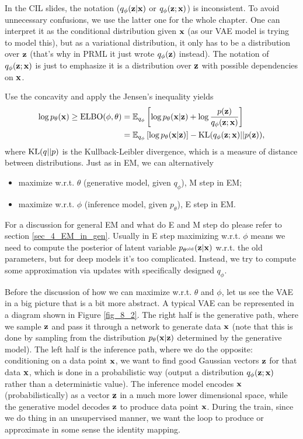 \documentclass[../book-template.tex]{subfiles}
\begin{document}
\begin{remark}
	In the CIL slides, the notation ($q_\phi({\bf z}|{\bf x})$ or $q_\phi({\bf z};{\bf x})$) is inconsistent. To avoid unnecessary confusions, we use the latter one for the whole chapter. One can interpret it as the conditional distribution given ${\bf x}$ (as our VAE model is trying to model this), but as a variational distribution, it only has to be a distribution over ${\bf z}$ (that's why in PRML it just wrote $q_\phi({\bf z})$ instead). The notation of $q_\phi({\bf z};{\bf x})$ is just to emphasize it is a distribution over ${\bf z}$ with possible dependencies on ${\bf x}$.
\end{remark}
Use the concavity and apply the Jensen's inequality yields
\begin{align*}
	\log p_{\theta}({\bf x})\geq {\rm ELBO}(\phi, \theta)&=\mathbb{E}_{q_{\phi}}\left[\log p_{\theta}({\bf x}|{\bf z}) + \log \frac{p({\bf z})}{q_{\phi}({\bf z};{\bf x})} \right]\\
	&=\mathbb{E}_{q_{\phi}}\left[\log p_{\theta}({\bf x}|{\bf z})\right] - {\rm KL}(q_{\phi}({\bf z};{\bf x})||p({\bf z})),
\end{align*}
where ${\rm KL}(q||p)$ is the Kullback-Leibler divergence, which is a measure of distance between distributions. Just as in EM, we can alternatively
\begin{itemize}
	\item maximize w.r.t. $\theta$ (generative model, given $q_{\phi}$), M step in EM;
	\item maximize w.r.t. $\phi$ (inference model, given $p_\theta$), E step in EM. 
\end{itemize}
For a discussion for general EM and what do E and M step do please refer to section \ref{sec_4_EM_in_gen}. Usually in E step maximizing  w.r.t. $\phi$ means we need to compute the posterior of latent variable $p_{\theta^{\rm old}}({\bf z}|{\bf x})$ w.r.t. the old parameters, but for deep models it's too complicated. Instead, we try to compute some approximation via updates with specifically designed $q_{\phi}$.
\par Before the discussion of how we can maximize w.r.t. $\theta$ and $\phi$, let us see the VAE in a big picture that is a bit more abstract. A typical VAE can be represented in a diagram shown in Figure \ref{fig_8_2}. The right half is the generative path, where we sample ${\bf z}$ and pass it through a network to generate data ${\bf x}$ (note that this is done by sampling from the distribution $p_\theta({\bf x}|{\bf z})$ determined by the generative model). The left half is the inference path, where we do the opposite: conditioning on a data point ${\bf x}$, we want to find good Gaussian vectors ${\bf z}$ for that data ${\bf x}$, which is done in a probabilistic way (output a distribution $q_{\phi}({\bf z};{\bf x})$ rather than a deterministic value). The inference model encodes ${\bf x}$ (probabilistically) as a vector ${\bf z}$ in a much more lower dimensional space, while the generative model decodes ${\bf z}$ to produce data point ${\bf x}$. During the train, since we do thing in an unsupervised manner, we want the loop to produce or approximate in some sense the identity mapping.
\end{document}
